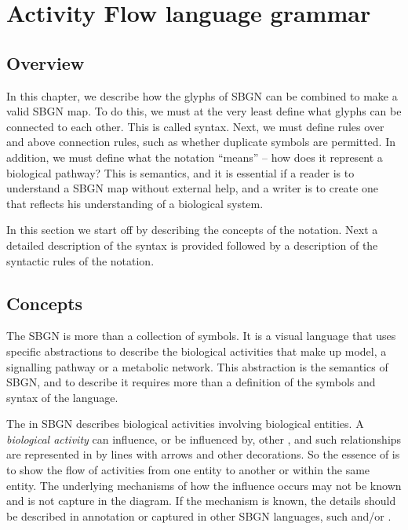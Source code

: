 \chapter{Activity Flow language grammar}
\label{chp:af:grammar}

\section{Overview}
In this chapter, we describe how the glyphs of SBGN \AF can be combined to make a valid SBGN \AF map. To do this, we must at the very least define what glyphs can be connected to each other. This is called syntax. Next, we must define rules over and above connection rules, such as whether duplicate symbols are permitted. In addition, we must define what the notation ``means'' -- how does it represent a biological pathway? This is semantics, and it is essential if a reader is to understand a SBGN map without external help, and a writer is to create one that reflects his understanding of a biological system.

In this section we start off by describing the concepts of the \AF{} notation. Next a detailed description of the syntax is provided
followed by a description of the syntactic rules of the notation.

\section{Concepts}

The SBGN \AF{} is more than a collection of symbols. It is a visual language that uses specific abstractions to describe the biological activities that make up  model, a signalling pathway or a metabolic network. This abstraction is the semantics of SBGN, and to describe it requires more than a definition of the symbols and syntax of the language. 

The \AF{} in SBGN describes biological activities involving biological entities. A \emph{biological activity} can influence, or be influenced by, other , and such relationships are represented in \AF by lines with arrows and other decorations. So the essence of \AF is to show the flow of activities from one entity to another or within the same entity. The underlying mechanisms of how the influence occurs may not be known and is not capture in the diagram. If the mechanism is known, the details should be described in annotation or captured in other SBGN languages, such \PD and/or \ER.





